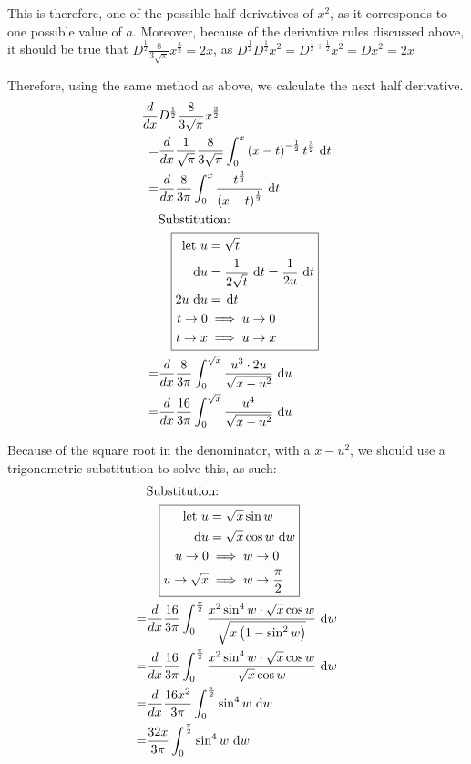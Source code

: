 \documentclass{article}
\DeclareMathOperator{\di}{\,d\!}
\newcommand{\IntSub}[1]{
{\textup{Substitution:}} \\
&\quad
\boxed{\begin{aligned}
		#1
\end{aligned}}
}
\begin{document}
This is therefore, one of the possible half derivatives of $x^2$, as it
corresponds to one possible value of $a$. Moreover, because of the derivative rules
discussed above, it should be true that $D^\frac{1}{2}\frac{8}{3\sqrt{\pi}} x^\frac{3}{2} = 2x$,
as $D^\frac{1}{2}D^\frac{1}{2}x^2=D^{\frac{1}{2} + \frac{1}{2}} x^2=D x^2 = 2x$

Therefore, using the same method as above, we calculate the next half derivative.
\begin{align*}
	\frac{d}{dx}&D^\frac{1}{2} \frac{8}{3\sqrt{\pi}} x^\frac{3}{2} \\
	=&\frac{d}{dx}\frac{1}{\sqrt{\pi}} \frac{8}{3\sqrt{\pi}} \int_0^x \left(x-t\right)^{-\frac{1}{2}} t^\frac{3}{2} \di t \\
	=&\frac{d}{dx}\frac{8}{3\pi} \int_0^x \frac{t^\frac{3}{2}}{\left(x-t\right)^\frac{1}{2}} \di t \\
	 &\IntSub{
		 \text{let } u &= \sqrt{t} \\
		\di u &= \frac{1}{2\sqrt{t}} \di t = \frac{1}{2u} \di t \\
		2u \di u &= \di t \\
		t \to 0 &\implies u \to 0 \\
		t \to x &\implies u \to x
	} \\
	=&\frac{d}{dx}\frac{8}{3\pi} \int_0^{\sqrt{x}} \frac{u^3 \cdot 2u}{\sqrt{x-u^2}} \di u \\
	=&\frac{d}{dx}\frac{16}{3\pi} \int_0^{\sqrt{x}} \frac{u^4}{\sqrt{x-u^2}} \di u \\
\end{align*}

Because of the square root in the denominator, with a $x-u^2$, we should use a trigonometric
substitution to solve this, as such:
\begin{align*}
	 &\IntSub{
		 \text{let } u &= \sqrt{x}\sin{w} \\
		 \di u &= \sqrt{x}\cos{w} \di w \\
		 u \to 0 &\implies w \to 0 \\
		 u \to \sqrt{x} &\implies w \to \frac{\pi}{2} \\
	 } \\
	=&\frac{d}{dx}\frac{16}{3\pi} \int_0^{\frac{\pi}{2}} \frac{x^2\sin^4w\cdot \sqrt{x}\cos{w}}{\sqrt{x\left(1-\sin^2w\right)}} \di w \\
	=&\frac{d}{dx}\frac{16}{3\pi} \int_0^{\frac{\pi}{2}} \frac{x^2\sin^4w\cdot \sqrt{x}\cos{w}}{\sqrt{x}\cos w} \di w \\
	=&\frac{d}{dx}\frac{16x^2}{3\pi} \int_0^{\frac{\pi}{2}} \sin^4w \di w \\
	=&\frac{32x}{3\pi} \int_0^{\frac{\pi}{2}} \sin^4w \di w \\
\end{align*}
\end{document}
